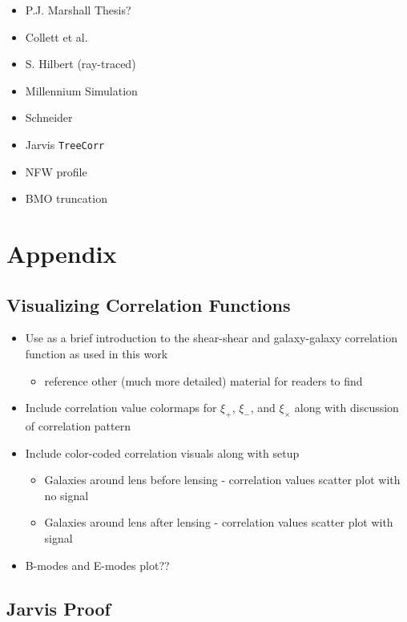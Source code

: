 \documentclass[%
 reprint,
 amsmath,amssymb,
 aps,
]{revtex4-1}
\begin{document}
\begin{itemize}
\item P.J. Marshall Thesis?
\item Collett et al.
\item S. Hilbert (ray-traced)
\item Millennium Simulation
\item Schneider
\item Jarvis \texttt{TreeCorr}
\item NFW profile
\item BMO truncation
\end{itemize}

\onecolumngrid
\section{Appendix}

\subsection{Visualizing Correlation Functions}

\begin{itemize}
\item Use as a brief introduction to the shear-shear and galaxy-galaxy correlation function as used in this work
    \begin{itemize}
    \item reference other (much more detailed) material for readers to find
    \end{itemize}
\item Include correlation value colormaps for $\xi_+$, $\xi_-$, and $\xi_\times$ along with discussion of correlation pattern
\item Include color-coded correlation visuals along with setup
    \begin{itemize}
    \item Galaxies around lens before lensing - correlation values scatter plot with no signal
    \item Galaxies around lens after lensing - correlation values scatter plot with signal
    \end{itemize}
\item B-modes and E-modes plot??
\end{itemize}

\subsection{Jarvis Proof}
\end{document}
